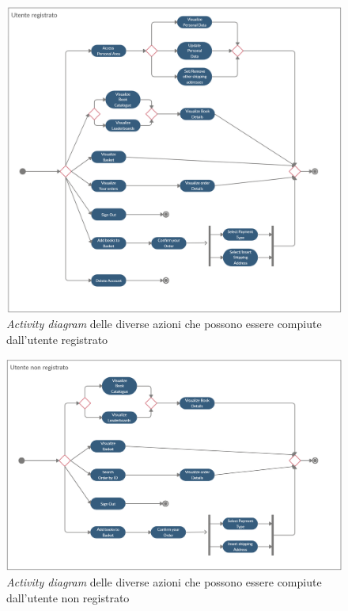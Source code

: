 \documentclass[a4paper,12pt,titlepage]{article}
\begin{document}
{{{\begin{figure}[H]
		\includegraphics[scale=0.35, angle=90]{activityDiagramRegistrato}
		\caption{\textit{Activity diagram} delle diverse azioni che possono essere compiute dall'utente registrato}
\end{figure}
\begin{figure}[H]
		\centering
		\includegraphics[scale=0.4, angle=90]{activityDiagramNonRegistrato}
		\caption{\textit{Activity diagram} delle diverse azioni che possono essere compiute dall'utente non registrato}
\end{figure}
\begin{figure}[H]
		\centering

\end{figure}}}}
\end{document}
